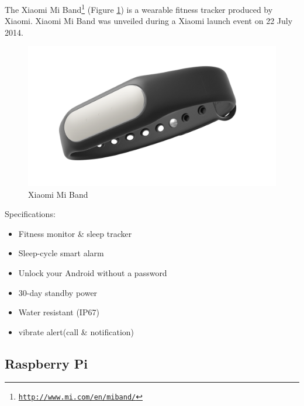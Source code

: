The Xiaomi Mi Band\footnote{\href{http://www.mi.com/en/miband/}{\texttt{http://www.mi.com/en/miband/}}} (Figure \ref{fig:smartband}) is a wearable fitness tracker produced by Xiaomi. Xiaomi Mi Band was unveiled during a Xiaomi launch event on 22 July 2014.
\begin{figure}[h]
	\centering
	\includegraphics[width=0.7\linewidth]{images/smartband}
	\caption{Xiaomi Mi Band}
	\label{fig:smartband}
\end{figure}

Specifications:
\begin{itemize}
	\item Fitness monitor \& sleep tracker
	\item Sleep-cycle smart alarm
	\item Unlock your Android without a password
	\item 30-day standby power
	\item Water resistant (IP67)
	\item vibrate alert(call \& notification)
\end{itemize}

\subsection{Raspberry Pi}

